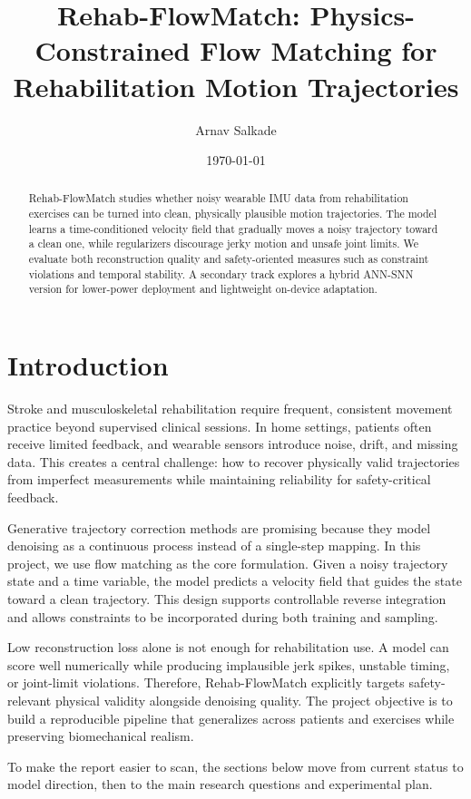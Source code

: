 \documentclass[11pt]{article}
\title{Rehab-FlowMatch: Physics-Constrained Flow Matching for Rehabilitation Motion Trajectories}
\author{Arnav Salkade}
\date{\today}
\begin{document}
\maketitle

\begin{abstract}
Rehab-FlowMatch studies whether noisy wearable IMU data from rehabilitation exercises can be turned into clean, physically plausible motion trajectories. The model learns a time-conditioned velocity field that gradually moves a noisy trajectory toward a clean one, while regularizers discourage jerky motion and unsafe joint limits. We evaluate both reconstruction quality and safety-oriented measures such as constraint violations and temporal stability. A secondary track explores a hybrid ANN-SNN version for lower-power deployment and lightweight on-device adaptation.
\end{abstract}

\section{Introduction}
Stroke and musculoskeletal rehabilitation require frequent, consistent movement practice beyond supervised clinical sessions. In home settings, patients often receive limited feedback, and wearable sensors introduce noise, drift, and missing data. This creates a central challenge: how to recover physically valid trajectories from imperfect measurements while maintaining reliability for safety-critical feedback.

Generative trajectory correction methods are promising because they model denoising as a continuous process instead of a single-step mapping. In this project, we use flow matching as the core formulation. Given a noisy trajectory state and a time variable, the model predicts a velocity field that guides the state toward a clean trajectory. This design supports controllable reverse integration and allows constraints to be incorporated during both training and sampling.

Low reconstruction loss alone is not enough for rehabilitation use. A model can score well numerically while producing implausible jerk spikes, unstable timing, or joint-limit violations. Therefore, Rehab-FlowMatch explicitly targets safety-relevant physical validity alongside denoising quality. The project objective is to build a reproducible pipeline that generalizes across patients and exercises while preserving biomechanical realism.

To make the report easier to scan, the sections below move from current status to model direction, then to the main research questions and experimental plan.
\end{document}
